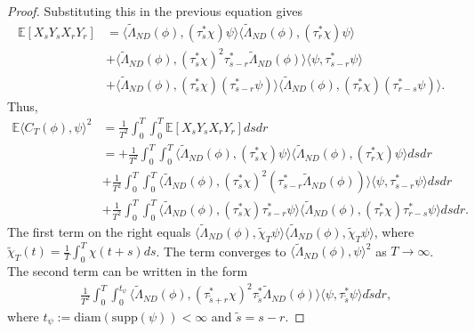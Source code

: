 \documentclass[10pt,a4paper]{article}
\theoremstyle{plain}
\theoremstyle{definition}
\theoremstyle{remark}
\numberwithin{equation}{section}
\newcommand{\E}{\mathbb{E}} %
\begin{document}
\begin{proof}
Substituting this in the previous equation gives 
  \begin{align}\label{isse3}
   \E[X_sY_sX_{r}Y_{r}]  &= \langle \tilde\Lambda_{ND} (\phi  ),  ( \tau_{s}^* \chi  )   \psi  \rangle \langle \tilde\Lambda_{ND} (\phi ),   (\tau_{r}^* \chi   ) \psi  \rangle \\ 
       &+\langle  \tilde\Lambda_{ND} (\phi ),  (\tau_{{s}}^* \chi )^2   \tau_{{s-r}}^* \tilde\Lambda_{ND} (\phi )   \rangle \langle  \psi ,  \tau_{s-r}^*\psi  \rangle  \\
           &+ \langle  \tilde\Lambda_{ND} (\phi  ),  (\tau_s^* \chi ) (\tau_{s-r}^* \psi ) \rangle \langle   \tilde\Lambda_{ND} (\phi ), (\tau_r^* \chi ) ( \tau_{r-s}^* \psi  )\rangle. 
\end{align} 
Thus,
\begin{align}
\E  \langle  C_T (\phi ), \psi \rangle^2  &=  \frac{1}{T^2} \int_0^T \int_0^T  \E[X_sY_sX_{r}Y_{r}]  ds dr \\ 
&= + \frac{1}{T^2} \int_0^T \int_0^T   \langle \tilde\Lambda_{ND} (\phi  ),  (\tau_{s}^* \chi)   \psi  \rangle \langle \tilde\Lambda_{ND} (\phi ),   (\tau_{r}^*\chi   ) \psi  \rangle  ds dr\label{isse41} \\  
       &+ \frac{1}{T^2} \int_0^T \int_0^T\langle  \tilde\Lambda_{ND} (\phi ),  (\tau_{{s}}^* \chi )^2  (  \tau_{{s-r}}^*\tilde\Lambda_{ND} (\phi ) )  \rangle \langle  \psi ,  \tau_{s-r}^*\psi  \rangle  ds dr\label{isse42} \\
           &+  \frac{1}{T^2} \int_0^T \int_0^T\langle  \tilde\Lambda_{ND} (\phi  ),  (\tau_s^*\chi)  \tau_{s-r}^*\psi  \rangle \langle   \tilde\Lambda_{ND} (\phi ), ( \tau_r^*\chi )  \tau_{r-s}^*\psi  \rangle ds dr. \label{isse43}
\end{align}
The first term on the right equals $ \langle  \tilde\Lambda_{ND} (\phi  ),  \tilde\chi_T \psi  \rangle \langle  \tilde\Lambda_{ND} (\phi ), \tilde\chi_T  \psi  \rangle $, where $\tilde\chi_T (t)  = \frac{1}{T} \int^T_0 \chi (t+s) ds $.
The term converges {to}  $ \langle   \tilde\Lambda_{ND} (\phi  ),  \psi  \rangle^2$ as $ T \to \infty$. 
The second term can be written in the form
\begin{align}
&   \frac{1}{T^2} \int_0^T \int_0^{t_\psi} \langle   \tilde\Lambda_{ND} (\phi ),  (\tau_{{\tilde{s}+r}}^*\chi )^2   \tau_{{\tilde{s}}}^*\tilde\Lambda_{ND} (\phi )   \rangle \langle  \psi ,  \tau_{\tilde{s}}^* \psi  \rangle  d\tilde{s} dr ,
 \end{align}
 where $t_\psi := \text{diam}  ( \text{supp} ( \psi )   ) < \infty$ and $ \tilde{s} = s-r$. 

\end{proof}
\end{document}
